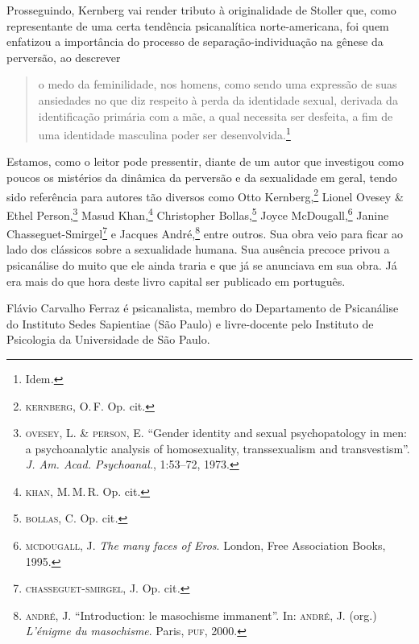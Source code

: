 Prosseguindo, Kernberg vai render tributo à originalidade de Stoller
que, como representante de uma certa tendência psicanalítica
norte-americana, foi quem enfatizou a importância do processo de
separação-individuação na gênese da perversão, ao descrever

\begin{quote}
o medo da feminilidade, nos homens, como sendo uma expressão de suas
ansiedades no que diz respeito à perda da identidade sexual, derivada da
identificação primária com a mãe, a qual necessita ser desfeita, a fim
de uma identidade masculina poder ser desenvolvida.\footnote{Idem\emph{.}}
\end{quote}

Estamos, como o leitor pode pressentir, diante de um autor que
investigou como poucos os mistérios da dinâmica da perversão e da
sexualidade em geral, tendo sido referência para autores tão diversos
como Otto Kernberg,\footnote{\textsc{kernberg}, O.\,F. Op. cit.} Lionel
Ovesey \& Ethel Person,\footnote{\textsc{ovesey}, L. \& \textsc{person},
  E. ``Gender identity and sexual psychopatology in men: a
  psychoanalytic analysis of homosexuality, transsexualism and
  transvestism''. \emph{J. Am. Acad. Psychoanal.}, 1:53--72, 1973.}
Masud Khan,\footnote{\textsc{khan}, M.\,M.\,R. Op. cit.} Christopher
Bollas,\footnote{\textsc{bollas}, C. Op. cit\emph{.}} Joyce
McDougall,\footnote{\textsc{mcdougall}, J. \emph{The many faces of Eros}.
  London, Free Association Books, 1995.} Janine
Chasseguet-Smirgel\footnote{\textsc{chasseguet-smirgel}, J. Op.
  cit\emph{.}} e Jacques André,\footnote{\textsc{andré}, J.
  ``Introduction: le masochisme immanent''. In: \textsc{andré}, J.
  (org.) \emph{L'énigme du masochisme}. Paris, \textsc{puf}, 2000.}
entre outros. Sua obra veio para ficar ao lado dos clássicos sobre a
sexualidade humana. Sua ausência precoce privou a psicanálise do muito
que ele ainda traria e que já se anunciava em sua obra. Já era mais do
que hora deste livro capital ser publicado em português.

{\par\vfill\footnotesize{}
Flávio Carvalho Ferraz é psicanalista, membro do
  Departamento de Psicanálise do Instituto Sedes Sapientiae (São Paulo)
  e livre-docente pelo Instituto de Psicologia da Universidade de São
  Paulo.
}
